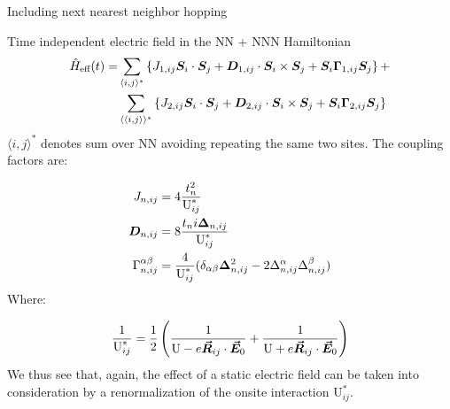 \begin{section}{Including next nearest neighbor hopping}
\begin{subsection}{Time independent electric field in the NN + NNN Hamiltonian}
\begin{align}
\hat{H}_{\text{eff}}(t) = &\sum_{\langle i,j \rangle ^*} \left\{ J_{1,ij}\boldsymbol{S}_i\cdot\boldsymbol{S}_j + \boldsymbol{D}_{1,ij}\cdot \boldsymbol{S}_i \times \boldsymbol{S}_j + \boldsymbol{S}_i\boldsymbol{\Gamma}_{1,ij}\boldsymbol{S}_j\right\} + \nonumber \\
&\sum_{\langle \langle i,j \rangle \rangle^*} \left\{ J_{2,ij}\boldsymbol{S}_i\cdot\boldsymbol{S}_j + \boldsymbol{D}_{2,ij} \cdot\boldsymbol{S}_i \times \boldsymbol{S}_j + \boldsymbol{S}_i\boldsymbol{\Gamma}_{2,ij}\boldsymbol{S}_j\right\}
\end{align}
$\langle i,j \rangle ^*$ denotes sum over NN avoiding repeating the same two sites. The coupling factors are:

\begin{align}
J_{n,ij} &= 4\frac{t_n^2}{\text{U}^*_{ij}} \\
\boldsymbol{D}_{n,ij} &= 8\frac{t_n i\boldsymbol{\Delta}_{n,ij}}{\text{U}^*_{ij}} \\
\Gamma_{n,ij}^{\alpha \beta} &= \frac{4}{\text{U}^*_{ij}}(\delta_{\alpha \beta} \boldsymbol{\Delta}_{n,ij}^2 - 2\Delta_{n,ij}^\alpha\Delta_{n,ij}^\beta )
\end{align}
Where:

\begin{equation}
\frac{1}{\text{U}^*_{ij}} =  \frac{1}{2}\left( \frac{1}{\text{U} - e\boldsymbol{\vec{R}}_{ij}\cdot\boldsymbol{\vec{E}}_0} + \frac{1}{\text{U} + e\boldsymbol{\vec{R}}_{ij}\cdot\boldsymbol{\vec{E}}_0} \right)
\end{equation}
We thus see that, again, the effect of a static electric field can be taken into consideration by a renormalization of the onsite interaction $\text{U}_{ij}^*$.
\end{subsection}

\end{section}